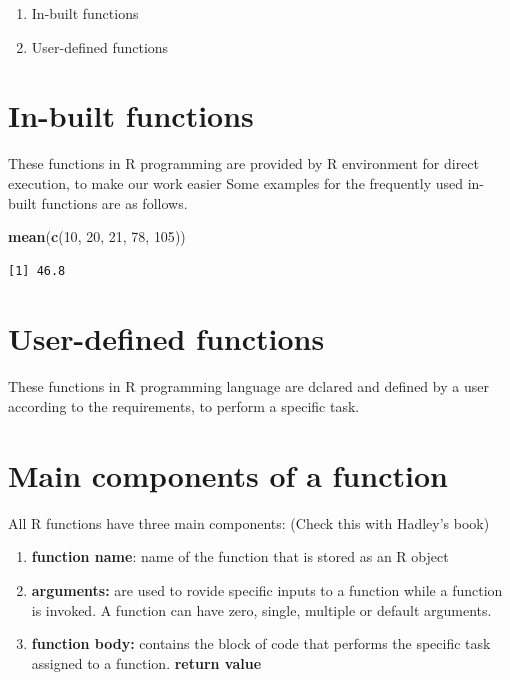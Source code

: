 \documentclass[]{book}
\newenvironment{Shaded}{\begin{snugshade}}{\end{snugshade}}
\newcommand{\DecValTok}[1]{\textcolor[rgb]{0.00,0.00,0.81}{#1}}
\newcommand{\KeywordTok}[1]{\textcolor[rgb]{0.13,0.29,0.53}{\textbf{#1}}}
\newcommand{\NormalTok}[1]{#1}
\begin{document}
\begin{enumerate}
\def\labelenumi{\arabic{enumi}.}
\item
  In-built functions
\item
  User-defined functions
\end{enumerate}

\hypertarget{in-built-functions}{%
\section{In-built functions}\label{in-built-functions}}

These functions in R programming are provided by R environment for direct execution, to make our work easier Some examples for the frequently used in-built functions are as follows.

\begin{Shaded}
\begin{Highlighting}[]
\KeywordTok{mean}\NormalTok{(}\KeywordTok{c}\NormalTok{(}\DecValTok{10}\NormalTok{, }\DecValTok{20}\NormalTok{, }\DecValTok{21}\NormalTok{, }\DecValTok{78}\NormalTok{, }\DecValTok{105}\NormalTok{))}
\end{Highlighting}
\end{Shaded}

\begin{verbatim}
[1] 46.8
\end{verbatim}

\hypertarget{user-defined-functions}{%
\section{User-defined functions}\label{user-defined-functions}}

These functions in R programming language are dclared and defined by a user according to the requirements, to perform a specific task.

\hypertarget{main-components-of-a-function}{%
\section{Main components of a function}\label{main-components-of-a-function}}

All R functions have three main components: (Check this with Hadley's book)

\begin{enumerate}
\def\labelenumi{\arabic{enumi}.}
\item
  \textbf{function name}: name of the function that is stored as an R object
\item
  \textbf{arguments:} are used to rovide specific inputs to a function while a function is invoked. A function can have zero, single, multiple or default arguments.
\item
  \textbf{function body:} contains the block of code that performs the specific task assigned to a function. \textbf{return value}
\end{enumerate}
\end{document}
